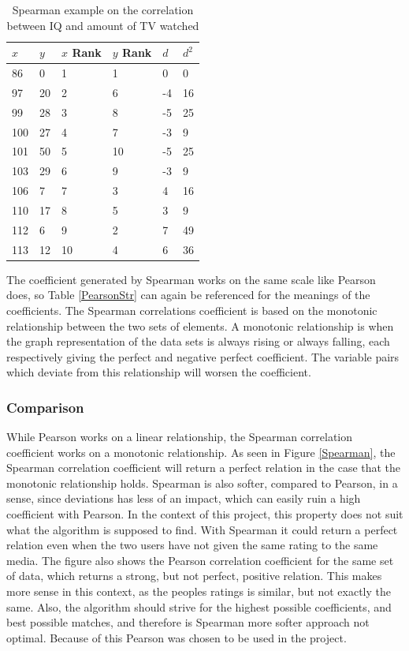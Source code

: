 \begin{table}[htb]
\centering
\begin{tabular}{|l|l|l|l|l|l|} \hline
	\textbf{$x$} & \textbf{$y$} & \textbf{$x$ Rank} & \textbf{$y$ Rank} & \textbf{$d$} & \textbf{$d^2$} \\ \hline
	86 & 0 & 1 & 1 & 0 & 0 \\ \hline
	97 & 20 & 2 & 6 & -4 & 16 \\ \hline
	99 & 28 & 3 & 8 & -5 & 25 \\ \hline
	100 & 27 & 4 & 7 & -3 & 9 \\ \hline
	101 & 50 & 5 & 10 & -5 & 25 \\ \hline
	103 & 29 & 6 & 9 & -3 & 9 \\ \hline
	106 & 7 & 7 & 3 & 4 & 16 \\ \hline
	110 & 17 & 8 & 5 & 3 & 9 \\ \hline
	112 & 6 & 9 & 2 & 7 & 49 \\ \hline
	113 & 12 & 10 & 4 & 6 & 36 \\ \hline
\end{tabular}
\caption{Spearman example on the correlation between IQ and amount of TV watched \cite{Spearman2}}
\label{SpearmanEx}
\end{table}

The coefficient generated by Spearman works on the same scale like Pearson does, so Table \ref{PearsonStr} can again be referenced for the meanings of the coefficients. The Spearman correlations coefficient is based on the monotonic relationship between the two sets of elements\cite{Spearman2}. A monotonic relationship is when the graph representation of the data sets is always rising or always falling, each respectively giving the perfect and negative perfect coefficient. The variable pairs which deviate from this relationship will worsen the coefficient.

\subsubsection{Comparison}

While Pearson works on a linear relationship, the Spearman correlation coefficient works on a monotonic relationship. As seen in Figure \ref{Spearman}, the Spearman correlation coefficient will return a perfect relation in the case that the monotonic relationship holds. Spearman is also softer, compared to Pearson, in a sense, since deviations has less of an impact, which can easily ruin a high coefficient with Pearson. In the context of this project, this property does not suit what the algorithm is supposed to find. With Spearman it could return a perfect relation even when the two users have not given the same rating to the same media. The figure also shows the Pearson correlation coefficient for the same set of data, which returns a strong, but not perfect, positive relation. This makes more sense in this context, as the peoples ratings is similar, but not exactly the same. Also, the algorithm should strive for the highest possible coefficients, and best possible matches, and therefore is Spearman more softer approach not optimal. Because of this Pearson was chosen to be used in the project.

